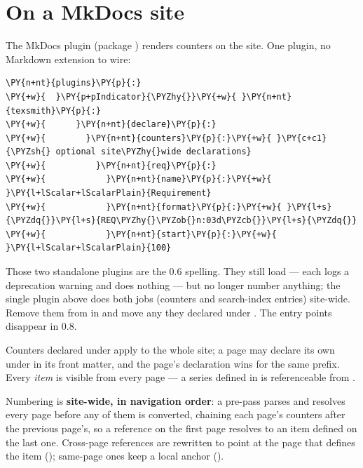\documentclass[a4paper,twoside]{article}
\begin{document}
\section{On a MkDocs site}
The  MkDocs plugin (package )
renders counters on the site. One plugin, no Markdown extension to wire:
\begin{tscode}[lang=yaml, engine=pygments]
\begin{Verbatim}[commandchars=\\\{\},breaklines, breakanywhere, commandchars=\\\{\}]
\PY{n+nt}{plugins}\PY{p}{:}
\PY{+w}{  }\PY{p+pIndicator}{\PYZhy{}}\PY{+w}{ }\PY{n+nt}{texsmith}\PY{p}{:}
\PY{+w}{      }\PY{n+nt}{declare}\PY{p}{:}
\PY{+w}{        }\PY{n+nt}{counters}\PY{p}{:}\PY{+w}{ }\PY{c+c1}{\PYZsh{} optional site\PYZhy{}wide declarations}
\PY{+w}{          }\PY{n+nt}{req}\PY{p}{:}
\PY{+w}{            }\PY{n+nt}{name}\PY{p}{:}\PY{+w}{ }\PY{l+lScalar+lScalarPlain}{Requirement}
\PY{+w}{            }\PY{n+nt}{format}\PY{p}{:}\PY{+w}{ }\PY{l+s}{\PYZdq{}}\PY{l+s}{REQ\PYZhy{}\PYZob{}n:03d\PYZcb{}}\PY{l+s}{\PYZdq{}}
\PY{+w}{            }\PY{n+nt}{start}\PY{p}{:}\PY{+w}{ }\PY{l+lScalar+lScalarPlain}{100}
\end{Verbatim}
\end{tscode}
\begin{tscallout}[kind=warning, title={\tscodeinline{texsmith.counters} and \tscodeinline{texsmith.index} are gone}]
Those two standalone plugins are the 0.6 spelling. They still load --- each
logs a deprecation warning and does nothing --- but no longer number
anything; the single  plugin above does both jobs (counters and
search-index entries) site-wide. Remove them from  in
 and move any  they declared under
. The entry points disappear in 0.8.
\end{tscallout}
Counters declared under  apply to the whole site; a page may
declare its own under  in its front matter, and the
page's declaration wins for the same prefix. Every \emph{item} is visible from every
page --- a series defined in  is referenceable from .

Numbering is \textbf{site-wide, in navigation order}: a pre-pass parses and resolves
every page before any of them is converted, chaining each page's counters after
the previous page's, so a reference on the first page resolves to an item
defined on the last one. Cross-page references are rewritten to point at the
page that defines the item ();
same-page ones keep a local anchor ().
\end{document}
